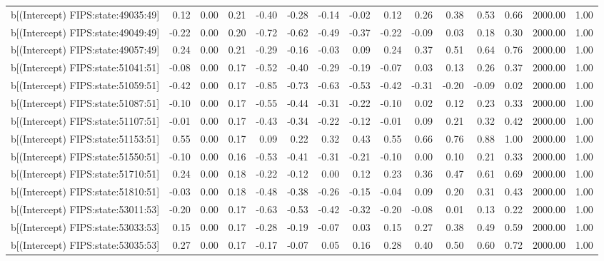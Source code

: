 \begin{table}[ht]
\begin{tabular}{rrrrrrrrrrrrrrr}
  b[(Intercept) FIPS:state:49035:49] & 0.12 & 0.00 & 0.21 & -0.40 & -0.28 & -0.14 & -0.02 & 0.12 & 0.26 & 0.38 & 0.53 & 0.66 & 2000.00 & 1.00 \\ 
  b[(Intercept) FIPS:state:49049:49] & -0.22 & 0.00 & 0.20 & -0.72 & -0.62 & -0.49 & -0.37 & -0.22 & -0.09 & 0.03 & 0.18 & 0.30 & 2000.00 & 1.00 \\ 
  b[(Intercept) FIPS:state:49057:49] & 0.24 & 0.00 & 0.21 & -0.29 & -0.16 & -0.03 & 0.09 & 0.24 & 0.37 & 0.51 & 0.64 & 0.76 & 2000.00 & 1.00 \\ 
  b[(Intercept) FIPS:state:51041:51] & -0.08 & 0.00 & 0.17 & -0.52 & -0.40 & -0.29 & -0.19 & -0.07 & 0.03 & 0.13 & 0.26 & 0.37 & 2000.00 & 1.00 \\ 
  b[(Intercept) FIPS:state:51059:51] & -0.42 & 0.00 & 0.17 & -0.85 & -0.73 & -0.63 & -0.53 & -0.42 & -0.31 & -0.20 & -0.09 & 0.02 & 2000.00 & 1.00 \\ 
  b[(Intercept) FIPS:state:51087:51] & -0.10 & 0.00 & 0.17 & -0.55 & -0.44 & -0.31 & -0.22 & -0.10 & 0.02 & 0.12 & 0.23 & 0.33 & 2000.00 & 1.00 \\ 
  b[(Intercept) FIPS:state:51107:51] & -0.01 & 0.00 & 0.17 & -0.43 & -0.34 & -0.22 & -0.12 & -0.01 & 0.09 & 0.21 & 0.32 & 0.42 & 2000.00 & 1.00 \\ 
  b[(Intercept) FIPS:state:51153:51] & 0.55 & 0.00 & 0.17 & 0.09 & 0.22 & 0.32 & 0.43 & 0.55 & 0.66 & 0.76 & 0.88 & 1.00 & 2000.00 & 1.00 \\ 
  b[(Intercept) FIPS:state:51550:51] & -0.10 & 0.00 & 0.16 & -0.53 & -0.41 & -0.31 & -0.21 & -0.10 & 0.00 & 0.10 & 0.21 & 0.33 & 2000.00 & 1.00 \\ 
  b[(Intercept) FIPS:state:51710:51] & 0.24 & 0.00 & 0.18 & -0.22 & -0.12 & 0.00 & 0.12 & 0.23 & 0.36 & 0.47 & 0.61 & 0.69 & 2000.00 & 1.00 \\ 
  b[(Intercept) FIPS:state:51810:51] & -0.03 & 0.00 & 0.18 & -0.48 & -0.38 & -0.26 & -0.15 & -0.04 & 0.09 & 0.20 & 0.31 & 0.43 & 2000.00 & 1.00 \\ 
  b[(Intercept) FIPS:state:53011:53] & -0.20 & 0.00 & 0.17 & -0.63 & -0.53 & -0.42 & -0.32 & -0.20 & -0.08 & 0.01 & 0.13 & 0.22 & 2000.00 & 1.00 \\ 
  b[(Intercept) FIPS:state:53033:53] & 0.15 & 0.00 & 0.17 & -0.28 & -0.19 & -0.07 & 0.03 & 0.15 & 0.27 & 0.38 & 0.49 & 0.59 & 2000.00 & 1.00 \\ 
  b[(Intercept) FIPS:state:53035:53] & 0.27 & 0.00 & 0.17 & -0.17 & -0.07 & 0.05 & 0.16 & 0.28 & 0.40 & 0.50 & 0.60 & 0.72 & 2000.00 & 1.00 \\ 

\end{tabular}
\end{table}
